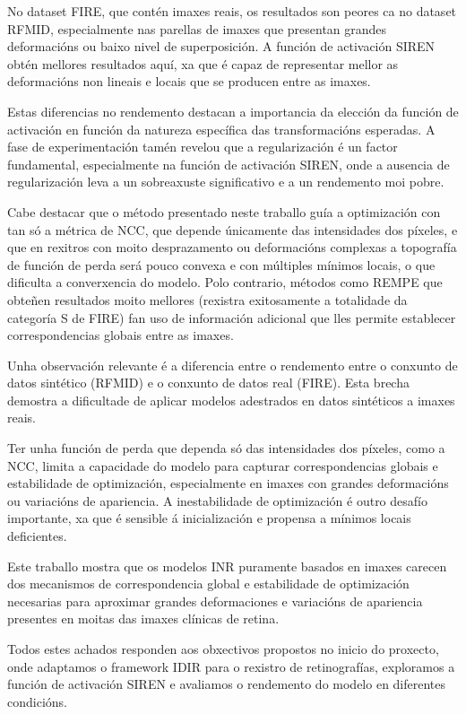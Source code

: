 No dataset FIRE, que contén imaxes reais, os resultados son peores ca no dataset RFMID, especialmente nas parellas de imaxes que presentan grandes deformacións ou baixo nivel de superposición.
A función de activación SIREN obtén mellores resultados aquí, xa que é capaz de representar mellor as deformacións non lineais e locais que se producen entre as imaxes.

Estas diferencias no rendemento destacan a importancia da elección da función de activación en función da natureza específica das transformacións esperadas.
A fase de experimentación tamén revelou que a regularización é un factor fundamental, especialmente na función de activación SIREN, onde a ausencia de regularización leva a un sobreaxuste significativo e a un rendemento moi pobre.

Cabe destacar que o método presentado neste traballo guía a optimización con tan só a métrica de NCC, que depende únicamente das intensidades dos píxeles, e que en rexitros con moito desprazamento ou deformacións complexas a topografía de función de perda será pouco convexa e con múltiples mínimos locais, o que dificulta a converxencia do modelo.
Polo contrario, métodos como REMPE \cite{rempe} que obteñen resultados moito mellores (rexistra exitosamente a totalidade da categoría S de FIRE) fan uso de información adicional que lles permite establecer correspondencias globais entre as imaxes.

Unha observación relevante é a diferencia entre o rendemento entre o conxunto de datos sintético (RFMID) e o conxunto de datos real (FIRE). Esta brecha demostra a dificultade de aplicar modelos adestrados en datos sintéticos a imaxes reais.

Ter unha función de perda que dependa só das intensidades dos píxeles, como a NCC, limita a capacidade do modelo para capturar correspondencias globais e estabilidade de optimización, especialmente en imaxes con grandes deformacións ou variacións de apariencia.
A inestabilidade de optimización é outro desafío importante, xa que é sensible á inicialización e propensa a mínimos locais deficientes.

Este traballo mostra que os modelos \gls{INR} puramente basados en imaxes carecen dos mecanismos de correspondencia global e estabilidade de optimización necesarias para aproximar grandes deformaciones e variacións de apariencia presentes en moitas das imaxes clínicas de retina.

Todos estes achados responden aos obxectivos propostos no inicio do proxecto, onde adaptamos o framework IDIR para o rexistro de retinografías, exploramos a función de activación SIREN e avaliamos o rendemento do modelo en diferentes condicións.
